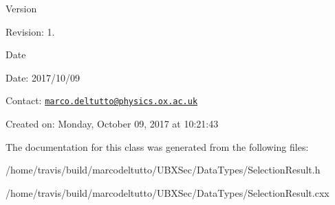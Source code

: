 \begin{DoxyVersion}{Version}

\end{DoxyVersion}
\begin{DoxyParagraph}{Revision\-:}
1. 
\end{DoxyParagraph}


\begin{DoxyDate}{Date}

\end{DoxyDate}
\begin{DoxyParagraph}{Date\-:}
2017/10/09 
\end{DoxyParagraph}


Contact\-: \href{mailto:marco.deltutto@physics.ox.ac.uk}{\tt marco.\-deltutto@physics.\-ox.\-ac.\-uk}

Created on\-: Monday, October 09, 2017 at 10\-:21\-:43 

The documentation for this class was generated from the following files\-:\begin{DoxyCompactItemize}
\item 
/home/travis/build/marcodeltutto/\-U\-B\-X\-Sec/\-Data\-Types/Selection\-Result.\-h\item 
/home/travis/build/marcodeltutto/\-U\-B\-X\-Sec/\-Data\-Types/Selection\-Result.\-cxx\end{DoxyCompactItemize}
